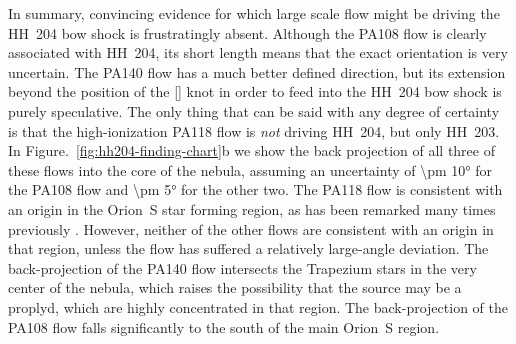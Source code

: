 \documentclass[twocolumn]{aastex63}
\begin{document}
In summary, convincing evidence for which large scale flow might be driving the
HH~204 bow shock is frustratingly absent.
Although the PA108 flow is clearly associated with HH~204, its short length means
that the exact orientation is very uncertain.
The PA140 flow has a much better defined direction,
but its extension beyond the position of the [] knot
in order to feed into the HH~204 bow shock is purely speculative.
The only thing that can be said with any degree of certainty is that the
high-ionization PA118 flow is \emph{not} driving HH~204, but only HH~203.
In Figure.~\ref{fig:hh204-finding-chart}b we show the back projection of
all three of these flows into the core of the nebula,
assuming an uncertainty of \ang{\pm 10} for the PA108 flow
and \ang{\pm 5} for the other two.
The PA118 flow is consistent with an origin in the Orion~S
star forming region,
as has been remarked many times previously
\citep{ODell:1997a, Rosado:2002e, ODell:2003n}.
However, neither of the other flows are consistent with an origin in that region,
unless the flow has suffered a relatively large-angle deviation.
The back-projection of the PA140 flow intersects the Trapezium stars
in the very center of the nebula, which raises the possibility that the source
may be a proplyd, which are highly concentrated in that region.
The back-projection of the PA108 flow falls significantly to the south
of the main Orion~S region.




\end{document}
